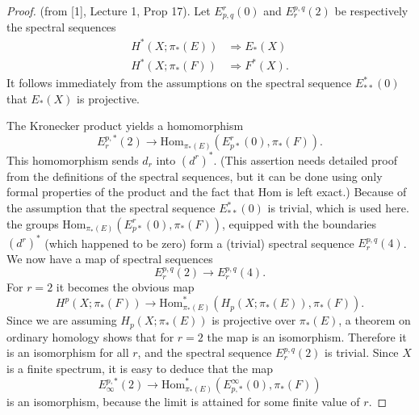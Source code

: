 \documentclass[../main]{subfiles}
\begin{document}
\begin{proof} (from [1], Lecture 1, Prop 17). Let $E^r_{p, q}(0)$ and $E^{p, q}_r(2)$ be respectively the spectral sequences
\begin{align*}H^\ast(X;\pi_\ast(E)) &\Longrightarrow E_\ast(X) \\
H^\ast(X;\pi_\ast(F)) &\Longrightarrow F^\ast(X).
\end{align*}
It follows immediately from the assumptions on the spectral sequence $E^\ast_{\ast \ast}(0)$ that $E_\ast(X)$ is projective.

The Kronecker product yields a homomorphism
\[E_r^{p, \ast}(2) \longrightarrow \text{Hom}_{\pi_\ast(E)}(E^r_{p \ast}(0), \pi_\ast(F)).\]
This homomorphism sends $d_r$ into $\left(d^r\right)^\ast$. (This assertion needs detailed proof from the definitions of the spectral sequences, but it can be done using only formal properties of the product and the fact that Hom is left exact.) Because of the assumption that the spectral sequence $E^\ast_{\ast \ast}(0)$ is trivial, which is used here. the groups $\text{Hom}_{\pi_\ast(E)}(E^r_{p \ast}(0), \pi_\ast(F))$, equipped with the boundaries $\left(d^r\right)^\ast$ (which happened to be zero) form a (trivial) spectral sequence $E^{p, q}_r(4)$. We now have a map of spectral sequences
\[E^{p,q}_r(2) \longrightarrow E^{p,q}_r(4).\]
For $r=2$ it becomes the obvious map
\[H^p(X;\pi_\ast(F)) \longrightarrow \text{Hom}^\ast_{\pi_\ast(E)}(H_p(X;\pi_\ast(E)), \pi_\ast(F)).\]
Since we are assuming $H_p(X;\pi_\ast(E))$ is projective over $\pi_\ast(E)$, a theorem on ordinary homology shows that for $r=2$ the map is an isomorphism. Therefore it is an isomorphism for all $r$, and the spectral sequence $E^{p,q}_r(2)$ is trivial. Since $X$ is a finite spectrum, it is easy to deduce that the map
\[E^{p, \ast}_\infty(2) \longrightarrow \text{Hom}^{\ast}_{\pi_\ast(E)}(E^\infty_{p, \ast}(0), \pi_\ast(F))\]
is an isomorphism, because the limit is attained for some finite value of $r$.


\end{proof}
\end{document}
